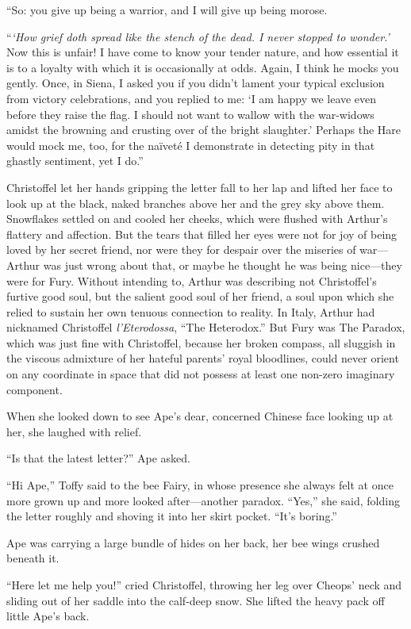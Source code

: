 \documentclass[11pt,a5paper]{article}
\begin{document}
``So: you give up being a warrior, and I will give up being morose.

``\emph{`How grief doth spread like the stench of the dead. I never stopped to wonder.'} Now this is unfair! I have come to know your tender nature, and how essential it is to a loyalty with which it is occasionally at odds. Again, I think he mocks you gently. Once, in Siena, I asked you if you didn't lament your typical exclusion from victory celebrations, and you replied to me: `I am happy we leave even before they raise the flag. I should not want to wallow with the war-widows amidst the browning and crusting over of the bright slaughter.' Perhaps the Hare would mock me, too, for the naïveté I demonstrate in detecting pity in that ghastly sentiment, yet I do.''

Christoffel let her hands gripping the letter fall to her lap and lifted her face to look up at the black, naked branches above her and the grey sky above them. Snowflakes settled on and cooled her cheeks, which were flushed with Arthur's flattery and affection. But the tears that filled her eyes were not for joy of being loved by her secret friend, nor were they for despair over the miseries of war---Arthur was just wrong about that, or maybe he thought he was being nice---they were for Fury. Without intending to, Arthur was describing not Christoffel's furtive good soul, but the salient good soul of her friend, a soul upon which she relied to sustain her own tenuous connection to reality. In Italy, Arthur had nicknamed Christoffel \emph{l'Eterodossa}, ``The Heterodox.'' But Fury was The Paradox, which was just fine with Christoffel, because her broken compass, all sluggish in the viscous admixture of her hateful parents' royal bloodlines, could never orient on any coordinate in space that did not possess at least one non-zero imaginary component.

When she looked down to see Ape's dear, concerned Chinese face looking up at her, she laughed with relief.

``Is that the latest letter?'' Ape asked.

``Hi Ape,'' Toffy said to the bee Fairy, in whose presence she always felt at once more grown up and more looked after---another paradox. ``Yes,'' she said, folding the letter roughly and shoving it into her skirt pocket. ``It's boring.''

Ape was carrying a large bundle of hides on her back, her bee wings crushed beneath it.

``Here let me help you!'' cried Christoffel, throwing her leg over Cheops' neck and sliding out of her saddle into the calf-deep snow. She lifted the heavy pack off little Ape's back.
\end{document}
